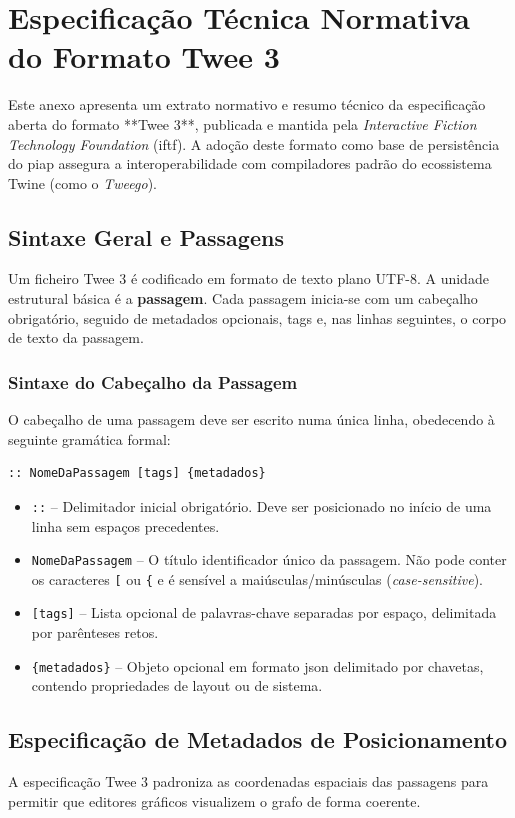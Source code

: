 \chapter{Especificação Técnica Normativa do Formato Twee 3}
\label{an:especificacao-twee3}

Este anexo apresenta um extrato normativo e resumo técnico da especificação aberta do formato **Twee 3**, publicada e mantida pela \textit{Interactive Fiction Technology Foundation} (\gls{iftf}). A adoção deste formato como base de persistência do \gls{piap} assegura a interoperabilidade com compiladores padrão do ecossistema Twine (como o \textit{Tweego}).

\section{Sintaxe Geral e Passagens}
Um ficheiro Twee 3 é codificado em formato de texto plano UTF-8. A unidade estrutural básica é a \textbf{passagem}. Cada passagem inicia-se com um cabeçalho obrigatório, seguido de metadados opcionais, tags e, nas linhas seguintes, o corpo de texto da passagem.

\subsection{Sintaxe do Cabeçalho da Passagem}
O cabeçalho de uma passagem deve ser escrito numa única linha, obedecendo à seguinte gramática formal:
\begin{verbatim}
:: NomeDaPassagem [tags] {metadados}
\end{verbatim}
\begin{itemize}
    \item \texttt{::} -- Delimitador inicial obrigatório. Deve ser posicionado no início de uma linha sem espaços precedentes.
    \item \texttt{NomeDaPassagem} -- O título identificador único da passagem. Não pode conter os caracteres \texttt{[} ou \texttt{\{} e é sensível a maiúsculas/minúsculas (\textit{case-sensitive}).
    \item \texttt{[tags]} -- Lista opcional de palavras-chave separadas por espaço, delimitada por parênteses retos.
    \item \texttt{\{metadados\}} -- Objeto opcional em formato \gls{json} delimitado por chavetas, contendo propriedades de layout ou de sistema.
\end{itemize}

\section{Especificação de Metadados de Posicionamento}
A especificação Twee 3 padroniza as coordenadas espaciais das passagens para permitir que editores gráficos visualizem o grafo de forma coerente.


